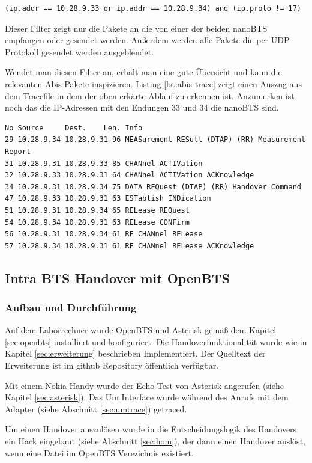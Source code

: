 \begin{lstlisting}[numbers=none]
(ip.addr == 10.28.9.33 or ip.addr == 10.28.9.34) and (ip.proto != 17)
\end{lstlisting}

Dieser Filter zeigt nur die Pakete an die von einer der beiden nanoBTS empfangen oder gesendet werden. Außerdem werden alle Pakete die per UDP Protokoll gesendet werden ausgeblendet.

Wendet man diesen Filter an, erhält man eine gute Übersicht und kann die relevanten Abis-Pakete inspizieren. Listing \ref{lst:abis-trace} zeigt einen Auszug aus dem Tracefile in dem der oben erkärte Ablauf zu erkennen ist. Anzumerken ist noch das die IP-Adressen mit den Endungen 33 und 34 die nanoBTS sind.

\begin{lstlisting}[label=lst:abis-trace,caption={Abis Trace mit Handover Nachrichten}]
No Source     Dest.    Len. Info
29 10.28.9.34 10.28.9.31 96	MEASurement RESult (DTAP) (RR) Measurement Report 
31 10.28.9.31 10.28.9.33 85	CHANnel ACTIVation 
32 10.28.9.33 10.28.9.31 64	CHANnel ACTIVation ACKnowledge 
34 10.28.9.31 10.28.9.34 75	DATA REQuest (DTAP) (RR) Handover Command 
47 10.28.9.33 10.28.9.31 63	ESTablish INDication 
51 10.28.9.31 10.28.9.34 65	RELease REQuest 
54 10.28.9.34 10.28.9.31 63	RELease CONFirm 
56 10.28.9.31 10.28.9.34 61	RF CHANnel RELease 
57 10.28.9.34 10.28.9.31 61 RF CHANnel RELease ACKnowledge 
\end{lstlisting}

\subsection{Intra BTS Handover mit OpenBTS}
\subsubsection{Aufbau und Durchführung}
Auf dem Laborrechner wurde OpenBTS und Asterisk gemäß dem Kapitel \ref{sec:openbts} installiert und konfiguriert. Die Handoverfunktionalität wurde wie in Kapitel \ref{sec:erweiterung} beschrieben Implementiert. Der Quelltext der Erweiterung ist im github Repository \cite{bib:openbtshandover} öffentlich verfügbar. 

Mit einem Nokia Handy wurde der Echo-Test von Asterisk angerufen (siehe Kapitel \ref{sec:asterisk}). Das Um Interface wurde während des Anrufs mit dem Adapter (siehe Abschnitt \ref{sec:umtrace}) getraced. 

Um einen Handover auszulösen wurde in die Entscheidungslogik des Handovers ein Hack eingebaut (siehe Abschnitt \ref{sec:hom}), der dann einen Handover auslöst, wenn eine Datei im OpenBTS Verezichnis existiert.

